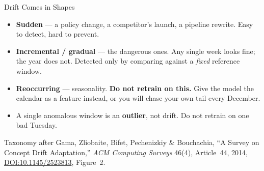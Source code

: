 
\begin{frame}{Drift Comes in Shapes}

    \centering

    \vspace{0.8em}
    \begin{itemize}
        \small
        \item \textbf{Sudden} --- a policy change, a competitor's launch, a pipeline rewrite. Easy to detect,
              hard to prevent.
        \item \textbf{Incremental / gradual} --- the dangerous ones. Any single week looks fine; the year does
              not. Detected only by comparing against a \emph{fixed} reference window.
        \item \textbf{Reoccurring} --- seasonality. \textbf{Do not retrain on this.} Give the model the
              calendar as a feature instead, or you will chase your own tail every December.
        \item A single anomalous window is an \textbf{outlier}, not drift. Do not retrain on one bad Tuesday.
    \end{itemize}

    \vspace{0.4em}
    {\scriptsize Taxonomy after Gama, Zliobaite, Bifet, Pechenizkiy \& Bouchachia,
    ``A Survey on Concept Drift Adaptation,'' \textit{ACM Computing Surveys} 46(4), Article~44, 2014,
    \href{https://dl.acm.org/doi/10.1145/2523813}{DOI:10.1145/2523813}, Figure~2.}

\end{frame}
